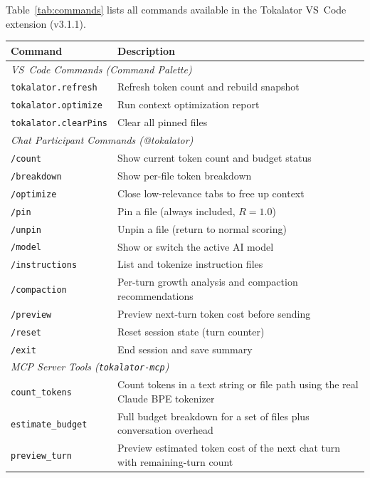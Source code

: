 \documentclass[a4paper,fleqn]{cas-dc}
\begin{document}
Table~\ref{tab:commands} lists all commands available in the Tokalator VS~Code extension (v3.1.1).

\begin{table}[htp!]
\centering
\small
\begin{tabular}{|l|p{7.5cm}|}
\hline
\textbf{Command} & \textbf{Description} \\
\hline
\multicolumn{2}{|l|}{\textit{VS~Code Commands (Command Palette)}} \\
\hline
\texttt{tokalator.refresh} & Refresh token count and rebuild snapshot \\
\hline
\texttt{tokalator.optimize} & Run context optimization report \\
\hline
\texttt{tokalator.clearPins} & Clear all pinned files \\
\hline
\multicolumn{2}{|l|}{\textit{Chat Participant Commands (@tokalator)}} \\
\hline
\texttt{/count} & Show current token count and budget status \\
\hline
\texttt{/breakdown} & Show per-file token breakdown \\
\hline
\texttt{/optimize} & Close low-relevance tabs to free up context \\
\hline
\texttt{/pin} & Pin a file (always included, $R = 1.0$) \\
\hline
\texttt{/unpin} & Unpin a file (return to normal scoring) \\
\hline
\texttt{/model} & Show or switch the active AI model \\
\hline
\texttt{/instructions} & List and tokenize instruction files \\
\hline
\texttt{/compaction} & Per-turn growth analysis and compaction recommendations \\
\hline
\texttt{/preview} & Preview next-turn token cost before sending \\
\hline
\texttt{/reset} & Reset session state (turn counter) \\
\hline
\texttt{/exit} & End session and save summary \\
\hline
\multicolumn{2}{|l|}{\textit{MCP Server Tools (\texttt{tokalator-mcp})}} \\
\hline
\texttt{count\_tokens} & Count tokens in a text string or file path using the real Claude BPE tokenizer \\
\hline
\texttt{estimate\_budget} & Full budget breakdown for a set of files plus conversation overhead \\
\hline
\texttt{preview\_turn} & Preview estimated token cost of the next chat turn with remaining-turn count \\

\end{tabular}
\end{table}
\end{document}
